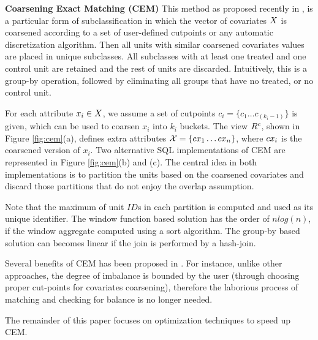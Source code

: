 
{\bf Coarsening Exact Matching (CEM)} This method as proposed
recently in \cite{IacKinPor09},  is a particular form of subclassification in which the vector of covariates ${{X}}$ is
coarsened according to a set of user-defined cutpoints or any
automatic discretization algorithm.  Then all units with similar
coarsened covariates values are placed in unique subclasses. All
subclasses with at least one treated and one control unit are retained
and the rest of units are discarded.  Intuitively, this is a group-by
operation, followed by eliminating all groups that have no treated, or
no control unit. 


For each attribute $x_i \in {{X}}$, we assume a set of cutpoints
$c_i=\{c_{1} \ldots c_{(k_i-1)}\}$ is given, which can be used to
coarsen $x_i$ into $k_i$ buckets. The view ${{R}^c}$, shown in Figure
\ref{fig:cem}(a), defines extra attributes
${{\mathcal{X}}}=\{{{{cx}}}_1 \ldots {{{cx}}}_n\}$, where ${{{cx}}}_i$ is the coarsened
version of $x_i$. Two alternative SQL implementations of CEM are
represented in Figure \ref{fig:cem}(b) and (c).  The central idea in
both implementations is to partition the units based on the coarsened
covariates and discard those partitions that do not enjoy the overlap assumption.
 Note that the maximum of unit
$ID$s in each partition is computed and used as its unique
identifier. The window function based solution has the order of
$nlog(n)$, if the window aggregate computed using a sort
algorithm. The group-by based solution can becomes linear if the join
is performed by a hash-join.


Several benefits of CEM has been proposed in \cite{IacKinPor09}. For
instance, unlike other approaches, the degree of imbalance is bounded
by the user (through choosing proper cut-points for covariates
coarsening), therefore the laborious process of matching and checking
for balance is no longer needed.   The remainder of this paper focuses on
optimization techniques to speed up CEM.


\vspace{-2mm} 